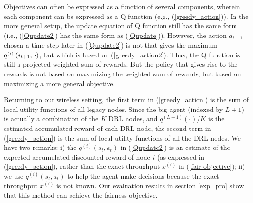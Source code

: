 \documentclass[journal,comsoc]{IEEEtran}
\begin{document}
Objectives can often be expressed as a function of several components,  wherein each component can be expressed as a Q function (e.g., (\ref{greedy_action})). In the more general setup, the update equation of Q function still has the same form (i.e., (\ref{Qupdate2}) has the same form as (\ref{Qupdate})). However, the action $ a_{t+1} $  chosen a time step later in (\ref{Qupdate2}) is not that gives the maximum  $ {q^{\left( i \right)}}\left( {{s_{t + 1}},{\kern 1pt} {\kern 1pt}  \cdot } \right) $, but which is based on (\ref{greedy_action2}). Thus, the Q function is still a projected weighted sum of rewards. But the policy that gives rise to the rewards is not based on maximizing the weighted sum of rewards, but based on maximizing a more general objective. 

Returning to our wireless setting, the first term in (\ref{greedy_action}) is the sum of local utility functions of all legacy nodes. Since  the big agent (indexed by   $ L+1 $) is actually a combination of the  $ K $ DRL nodes, and $ {q^{\left( {L + 1} \right)}}\left( \cdot \right)/K $  is the estimated accumulated reward of each DRL node, the second term in (\ref{greedy_action}) is the sum of local utility functions of all the DRL nodes. We have two remarks:  i) the $ {q^{\left( i \right)}}\left( {{s_t},{a_t}} \right) $  in (\ref{Qupdate2}) is an estimate of the expected accumulated discounted reward of node $ i $ (as expressed in (\ref{greedy_action}), rather than the exact throughput  $ {x^{\left( i \right)}} $  in (\ref{fair-objective}); ii) we use $ {q^{\left( i \right)}}\left( {{s_t},{a_t}} \right) $  to help the agent make decisions because the exact throughput $ {x^{\left( i \right)}} $  is not known. Our evaluation results in section \ref{exp_pro} show that this method can achieve the fairness objective. 
\end{document}
